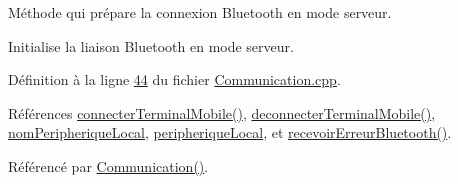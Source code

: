 Méthode qui prépare la connexion Bluetooth en mode serveur. 

Initialise la liaison Bluetooth en mode serveur. 

Définition à la ligne \hyperlink{_communication_8cpp_source_l00044}{44} du fichier \hyperlink{_communication_8cpp_source}{Communication.\+cpp}.



Références \hyperlink{_communication_8cpp_source_l00147}{connecter\+Terminal\+Mobile()}, \hyperlink{_communication_8cpp_source_l00160}{deconnecter\+Terminal\+Mobile()}, \hyperlink{_communication_8h_source_l00055}{nom\+Peripherique\+Local}, \hyperlink{_communication_8h_source_l00053}{peripherique\+Local}, et \hyperlink{_communication_8cpp_source_l00168}{recevoir\+Erreur\+Bluetooth()}.



Référencé par \hyperlink{_communication_8cpp_source_l00020}{Communication()}.


